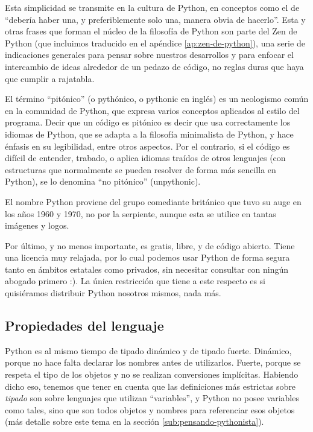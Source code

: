 Esta simplicidad se transmite en la cultura de Python, en conceptos como el de ``debería haber una, y preferiblemente solo una, manera obvia de hacerlo''. Esta y otras frases que forman el núcleo de la filosofía de Python son parte del Zen de Python \cite{zen-de-python} (que incluimos traducido en el apéndice \ref{ap:zen-de-python}), una serie de indicaciones generales para pensar sobre nuestros desarrollos y para enfocar el intercambio de ideas alrededor de un pedazo de código, no reglas duras que haya que cumplir a rajatabla.

El término ``pitónico'' (o pythónico, o pythonic en inglés) es un neologismo común en la comunidad de Python, que expresa varios conceptos aplicados al estilo del programa. Decir que un código es pitónico es decir que usa correctamente los idiomas de Python, que se adapta a la filosofía minimalista de Python, y hace énfasis en su legibilidad, entre otros aspectos. Por el contrario, si el código es difícil de entender, trabado, o aplica idiomas traídos de otros lenguajes (con estructuras que normalmente se pueden resolver de forma más sencilla en Python), se lo denomina ``no pitónico'' (unpythonic).

\begin{info}
El nombre Python proviene del grupo comediante británico que tuvo su auge en los años 1960 y 1970, no por la serpiente, aunque esta se utilice en tantas imágenes y logos.
\end{info}

Por último, y no menos importante, es gratis, libre, y de código abierto. Tiene una licencia muy relajada, por lo cual podemos usar Python de forma segura tanto en ámbitos estatales como privados, sin necesitar consultar con ningún abogado primero :). La única restricción que tiene a este respecto es si quisiéramos distribuir Python nosotros mismos, nada más.


\subsection{Propiedades del lenguaje}\label{intro--propiedades-del-lenguaje}

Python es al mismo tiempo de tipado dinámico y de tipado fuerte. Dinámico, porque no hace falta declarar los nombres antes de utilizarlos. Fuerte, porque se respeta el tipo de los objetos y no se realizan conversiones implícitas. Habiendo dicho eso, tenemos que tener en cuenta que las definiciones más estrictas sobre \textit{tipado} son sobre lenguajes que utilizan ``variables'', y Python no posee variables como tales, sino que son todos objetos y nombres para referenciar esos objetos (más detalle sobre este tema en la sección \ref{sub:pensando-pythonista}).

